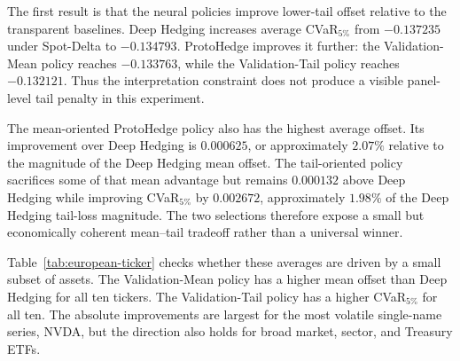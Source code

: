 \documentclass[sigconf]{acmart}
\begin{document}
The first result is that the neural policies improve lower-tail offset relative
to the transparent baselines. Deep Hedging increases average CVaR$_{5\%}$ from
$-0.137235$ under Spot-Delta to $-0.134793$. ProtoHedge improves it further:
the Validation-Mean policy reaches $-0.133763$, while the Validation-Tail policy
reaches $-0.132121$. Thus the interpretation constraint does not produce a
visible panel-level tail penalty in this experiment.

The mean-oriented ProtoHedge policy also has the highest average offset. Its
improvement over Deep Hedging is $0.000625$, or approximately $2.07\%$ relative
to the magnitude of the Deep Hedging mean offset. The tail-oriented policy
sacrifices some of that mean advantage but remains $0.000132$ above Deep
Hedging while improving CVaR$_{5\%}$ by $0.002672$, approximately $1.98\%$ of
the Deep Hedging tail-loss magnitude. The two selections therefore expose a
small but economically coherent mean--tail tradeoff rather than a universal
winner.

Table~\ref{tab:european-ticker} checks whether these averages are driven by a
small subset of assets. The Validation-Mean policy has a higher mean offset
than Deep Hedging for all ten tickers. The Validation-Tail policy has a higher
CVaR$_{5\%}$ for all ten. The absolute improvements are largest for the most
volatile single-name series, NVDA, but the direction also holds for broad
market, sector, and Treasury ETFs.
\end{document}
